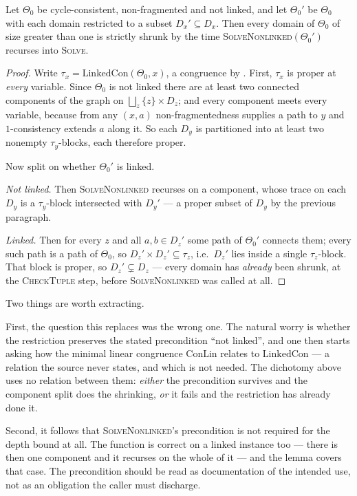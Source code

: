 \begin{lemma}\label{lem:solvenonlinked-callsite}
Let $\Theta_{0}$ be cycle-consistent, non-fragmented and not linked, and let
$\Theta_{0}'$ be $\Theta_{0}$ with each domain restricted to a subset
$D_{x}'\subseteq D_{x}$. Then every domain of $\Theta_{0}$ of size greater than
one is strictly shrunk by the time \textsc{SolveNonlinked}$(\Theta_{0}')$
recurses into \textsc{Solve}.
\end{lemma}

\begin{proof}
Write $\tau_{x}=\mathrm{LinkedCon}(\Theta_{0},x)$, a congruence by
\cite[Lem.~6.2]{ZhukJACM}. First, $\tau_{x}$ is proper at \emph{every}
variable. Since $\Theta_{0}$ is not linked there are at least two connected
components of the graph on $\bigsqcup_{z}\{z\}\times D_{z}$; and every
component meets every variable, because from any $(x,a)$ non-fragmentedness
supplies a path to $y$ and $1$-consistency extends $a$ along it. So each
$D_{y}$ is partitioned into at least two nonempty $\tau_{y}$-blocks, each
therefore proper.

Now split on whether $\Theta_{0}'$ is linked.

\emph{Not linked.} Then \textsc{SolveNonlinked} recurses on a component, whose
trace on each $D_{y}$ is a $\tau_{y}$-block intersected with $D_{y}'$ --- a
proper subset of $D_{y}$ by the previous paragraph.

\emph{Linked.} Then for every $z$ and all $a,b\in D_{z}'$ some path of
$\Theta_{0}'$ connects them; every such path is a path of $\Theta_{0}$, so
$D_{z}'\times D_{z}'\subseteq\tau_{z}$, i.e.\ $D_{z}'$ lies inside a single
$\tau_{z}$-block. That block is proper, so $D_{z}'\subsetneq D_{z}$ --- every
domain has \emph{already} been shrunk, at the \textsc{CheckTuple} step, before
\textsc{SolveNonlinked} was called at all.
\end{proof}

\begin{entry}\label{ent:callsite-moral}
Two things are worth extracting.

First, the question this replaces was the wrong one. The natural worry is
whether the restriction preserves the stated precondition ``not linked'', and
one then starts asking how the minimal linear congruence $\mathrm{ConLin}$
relates to $\mathrm{LinkedCon}$ --- a relation the source never states, and
which is not needed. The dichotomy above uses no relation between them:
\emph{either} the precondition survives and the component split does the
shrinking, \emph{or} it fails and the restriction has already done it.

Second, it follows that \textsc{SolveNonlinked}'s precondition is not required
for the depth bound at all. The function is correct on a linked instance too
--- there is then one component and it recurses on the whole of it --- and the
lemma covers that case. The precondition should be read as documentation of the
intended use, not as an obligation the caller must discharge.
\end{entry}

